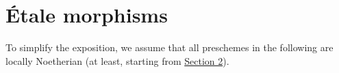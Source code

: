 \chapter{\'{E}tale morphisms}
\label{I}

To simplify the exposition, we assume that all preschemes in the following are locally Noetherian (at least, starting from \hyperref[I.2]{Section 2}).



% 
% 
% 
% 
% 
% 
% 
% 
% 